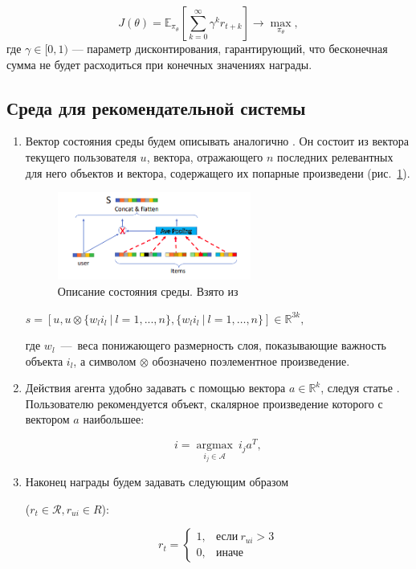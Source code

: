 \documentclass[14pt]{extarticle}
\DeclareMathOperator*{\argmax}{argmax}
\begin{document}
$$J(\theta) = \mathbb{E}_{\pi_{\theta}} \left[ \sum\limits_{k=0}^{\infty} \gamma^k r_{t+k}\right] \rightarrow \max_{\pi_{\theta}},$$
где $\gamma \in [0, 1)$ --- параметр дисконтирования, гарантирующий, что бесконечная сумма не будет расходиться при конечных значениях награды. 

\subsection{Среда для рекомендательной системы}

\begin{enumerate}

\item

Вектор состояния среды будем описывать аналогично \cite{Liu2018DeepRL}. Он состоит из вектора текущего пользователя $u$, вектора, отражающего $n$ последних релевантных для него объектов и вектора, содержащего их попарные произведени (рис.~\ref{fig:state}).

\begin{figure}[h]
	\centering
	\includegraphics[width=0.6\textwidth]{img/state_representation.png}
	\caption{Описание состояния среды. Взято из \cite{Liu2018DeepRL}}
	\label{fig:state}
\end{figure}

$s = \left[u, u \otimes \{w_l i_l\ |\ l = 1, ..., n\}, \{w_l i_l\ |\ l = 1,\dots, n\}\right] \in \mathbb{R}^{3k} ,$

где $w_l$~---~веса понижающего размерность слоя, показывающие важность объекта $i_l$, а символом $\otimes$ обозначено поэлементное произведение.

\item
Действия агента удобно задавать с помощью вектора $a\in \mathbb{R}^k$, следуя статье \cite{wolpertinger}. Пользователю рекомендуется объект, скалярное произведение которого с вектором $a$ наибольшее:

$$i = \underset{i_j\in \mathcal{A}}{\argmax}\ i_j a^T,$$

\item

Наконец награды будем задавать следующим образом 

($r_t\in \mathcal{R}, r_{ui} \in R$):

$$r_t= 
\begin{cases}
    1,& \text{если}\ r_{ui} > 3\\
    0,              & \text{иначе}
\end{cases}
$$
\end{enumerate}
\end{document}
